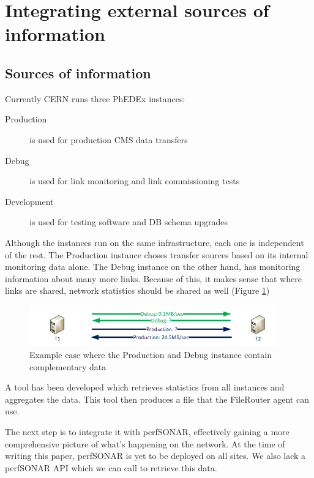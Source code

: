 \section{Integrating external sources of information}

\subsection{Sources of information}

Currently CERN runs three PhEDEx instances:

\begin{description}
	\item[Production] is used for production CMS data transfers
	\item[Debug] is used for link monitoring and link commissioning tests
	\item[Development] is used for testing software and DB schema upgrades
\end{description}

Although the instances run on the same infrastructure, each one is independent 
of the rest. The Production instance choses transfer sources based on its 
internal monitoring data alone. The Debug instance on the other hand,
has monitoring information about many more links. Because of this, it makes
sense that where links are shared, network statistics should be shared
as well (Figure \ref{fig:Prod-vs-Debug})

\begin{figure}[h]
  \centering
  \includegraphics[width=0.95\textwidth]{Figures/Debug-vs-Prod-instance.png}
  \caption{Example case where the Production and Debug instance contain complementary
  data}
  \label{fig:Prod-vs-Debug}
\end{figure} 

A tool has been developed which retrieves statistics from all instances and 
aggregates the data. This tool then produces a file that the FileRouter agent
can use.

The next step is to integrate it with perfSONAR, effectively gaining a 
more comprehensive picture of what's happening on the network. At the time of
writing this paper, perfSONAR is yet to be deployed on all sites. We also
lack a perfSONAR API which we can call to retrieve this data.